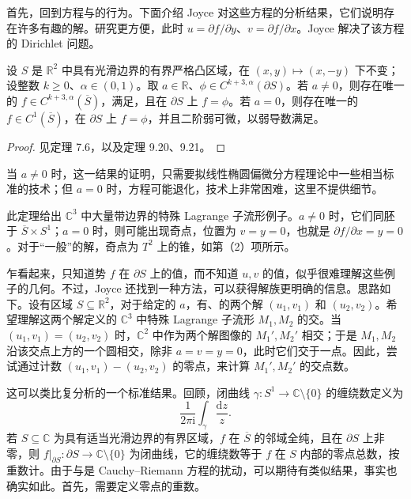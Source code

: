 首先，回到方程与的行为。下面介绍 Joyce 对这些方程的分析结果，它们说明存在许多有趣的解。研究更方便，此时 $u=\partial f/\partial y$、$v=\partial f/\partial x$。Joyce 解决了该方程的 Dirichlet 问题。
\begin{theorem}\label{thm:7.12}
设 $S$ 是 $\mathbb R^2$ 中具有光滑边界的有界严格凸区域，在 $(x,y)\mapsto(x,-y)$ 下不变；设整数 $k\geq0$、$\alpha\in(0,1)$。取 $a\in\mathbb R$、$\phi\in C^{k+3,\alpha}(\partial S)$。若 $a\neq0$，则存在唯一的 $f\in C^{k+3,\alpha}(\overline S)$，满足，且在 $\partial S$ 上 $f=\phi$。若 $a=0$，则存在唯一的 $f\in C^1(\overline S)$，在 $\partial S$ 上 $f=\phi$，并且二阶弱可微，以弱导数满足。
\end{theorem}

\begin{proof}
见定理 7.6，以及定理 9.20、9.21。
\end{proof}

当 $a\neq0$ 时，这一结果的证明，只需要拟线性椭圆偏微分方程理论中一些相当标准的技术；但 $a=0$ 时，方程可能退化，技术上非常困难，这里不提供细节。

此定理给出 $\mathbb C^3$ 中大量带边界的特殊 Lagrange 子流形例子。$a\neq0$ 时，它们同胚于 $\overline S\times S^1$；$a=0$ 时，则可能出现奇点，位置为 $v=y=0$，也就是 $\partial f/\partial x=y=0$。对于“一般”的解，奇点为 $T^2$ 上的锥，如第（2）项所示。

乍看起来，只知道势 $f$ 在 $\partial S$ 上的值，而不知道 $u,v$ 的值，似乎很难理解这些例子的几何。不过，Joyce 还找到一种方法，可以获得解族更明确的信息。思路如下。设有区域 $S\subseteq\mathbb R^2$，对于给定的 $a$，有、的两个解 $(u_1,v_1)$ 和 $(u_2,v_2)$。希望理解这两个解定义的 $\mathbb C^3$ 中特殊 Lagrange 子流形 $M_1,M_2$ 的交。当 $(u_1,v_1)=(u_2,v_2)$ 时，$\mathbb C^2$ 中作为两个解图像的 $M_1',M_2'$ 相交；于是 $M_1,M_2$ 沿该交点上方的一个圆相交，除非 $a=v=y=0$，此时它们交于一点。因此，尝试通过计数 $(u_1,v_1)-(u_2,v_2)$ 的零点，来计算 $M_1',M_2'$ 的交点数。

这可以类比复分析的一个标准结果。回顾，闭曲线 $\gamma\colon S^1\to\mathbb C\setminus\{0\}$ 的缠绕数定义为
\[
\frac1{2\pi\mathrm i}\int_\gamma\frac{\mathrm dz}{z}.
\]
若 $S\subseteq\mathbb C$ 为具有适当光滑边界的有界区域，$f$ 在 $\overline S$ 的邻域全纯，且在 $\partial S$ 上非零，则 $f|_{\partial S}\colon\partial S\to\mathbb C\setminus\{0\}$ 为闭曲线，它的缠绕数等于 $f$ 在 $S$ 内部的零点总数，按重数计。由于与是 Cauchy--Riemann 方程的扰动，可以期待有类似结果，事实也确实如此。首先，需要定义零点的重数。

